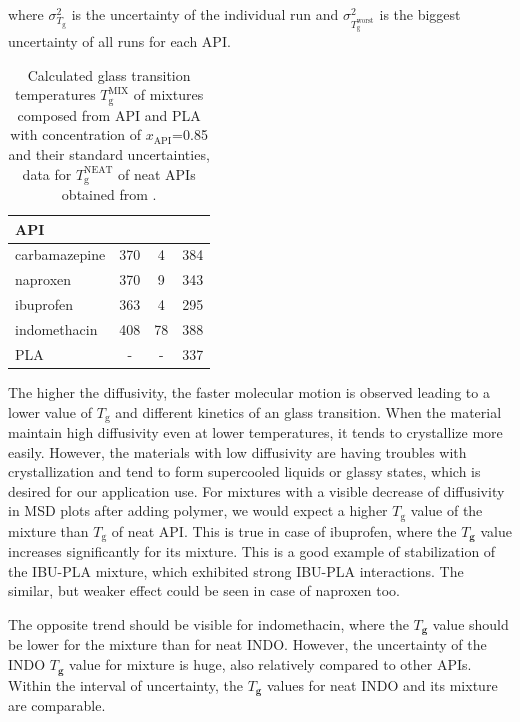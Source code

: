 where $\sigma_{T_{\text{g}}^\text{}}^2$ is the uncertainty of the individual run and  $\sigma_{T_{\text{g}}^\text{worst}}^2$ is the biggest uncertainty of all runs for each API.

\begin{table}[H]
	\caption{Calculated glass transition temperatures $T_\text{g}^\text{MIX}$ of mixtures composed from API and PLA with concentration of $x_\text{API}$=0.85 and their standard uncertainties, data for $T_\text{g}^\text{NEAT}$ of neat APIs obtained from \cite{cervinka_structure_2021}.}
	\centering
	\vspace{-0.2cm}
	\begin{tabular}{lccc} \toprule
		{\textbf{API}} & {\textbf{\boldmath{$T_{\text{g}}^\text{MIX}$}}} & \textbf{{\boldmath{$\sigma_{T_{\text{g}}^\text{MIX}}$}}} &
		\textbf{\boldmath{$T_{\text{g}}^\text{NEAT}$}}\\
		\midrule
		carbamazepine  & 370 & 4 & 384\\		
		naproxen   & 370 & 9 & 343\\
		ibuprofen  & 363 & 4 & 295\\
		indomethacin  & 408 & 78 & 388\\
		PLA & - & - & 337\\
		\bottomrule
	\end{tabular}
	\label{tab:Tg_mix} 
	\vspace{-0.2cm}
\end{table} 

\newpage
The higher the diffusivity, the faster molecular motion is observed leading to a lower value of $T_\text{g}$ and different kinetics of an glass transition. When the material maintain high diffusivity even at lower temperatures, it tends to crystallize more easily. However, the materials with low diffusivity are having troubles with crystallization and tend to form supercooled liquids or glassy states, which is desired for our application use. For mixtures with a visible decrease of diffusivity in MSD plots after adding polymer, we would expect a higher $T_\text{g}$ value of the mixture than $T_\text{g}$ of neat API. This is true in case of ibuprofen, where the $T_\textbf{g}$ value increases significantly for its mixture. This is a good example of stabilization of the IBU-PLA mixture, which exhibited strong IBU-PLA interactions. The similar, but weaker effect could be seen in case of naproxen too.

The opposite trend should be visible for indomethacin, where the $T_\textbf{g}$ value should be lower for the mixture than for neat INDO. However, the uncertainty of the INDO $T_\textbf{g}$ value for mixture is huge, also relatively compared to other APIs. Within the interval of uncertainty, the $T_\textbf{g}$ values for neat INDO and its mixture are comparable. 

